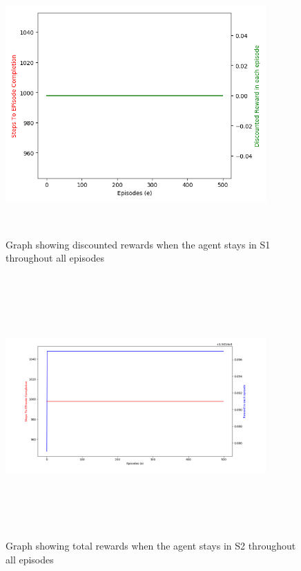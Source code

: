 \documentclass[conference]{IEEEtran}
\begin{document}
\begin{figure}[htbp]
\centerline{\includegraphics[width=10cm,height=10cm,keepaspectratio]{1-29_2.png}}
\caption{Graph showing discounted rewards when the agent stays in S1 throughout all episodes}
\label{fig}
\end{figure}

\begin{figure}[htbp]
\centerline{\includegraphics[width=10cm,height=10cm,keepaspectratio]{31-69_1.png}}
\caption{Graph showing total rewards when the agent stays in S2 throughout all episodes}
\label{fig}
\end{figure}
\end{document}
